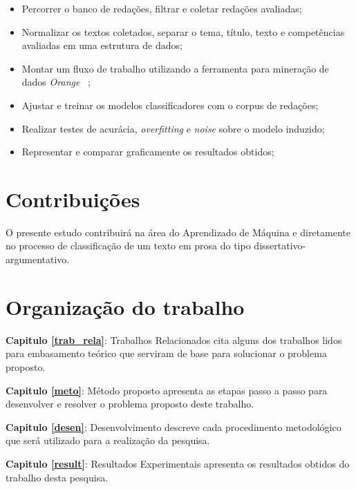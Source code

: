 \begin{itemize}
 \item Percorrer o banco de redações, filtrar e coletar redações avaliadas;
 \item Normalizar os textos coletados, separar o tema, título, texto e competências avaliadas em uma estrutura de dados;
 \item Montar um fluxo de trabalho utilizando a ferramenta para mineração de dados \textit{Orange} ~\cite{JMLR:demsar13a};
 \item Ajustar e treinar os modelos classificadores com o corpus de redações; 
 \item Realizar testes de acurácia, \textit{overfitting} e \textit{noise} sobre o modelo induzido;
 \item Representar e comparar graficamente os resultados obtidos;
\end{itemize}

\section{Contribuições}

O presente estudo contribuirá na área do Aprendizado de Máquina e diretamente no processo de classificação de um texto em prosa do tipo dissertativo-argumentativo.

\section{Organização do trabalho}

\noindent \textbf{Capitulo \ref{trab_rela}}: Trabalhos Relacionados cita alguns dos trabalhos lidos para  embasamento teórico que serviram de base para solucionar o problema proposto.

\noindent \textbf{Capitulo \ref{meto}}: Método proposto apresenta as etapas passo a passo para desenvolver e resolver o problema proposto deste trabalho.

\noindent \textbf{Capitulo \ref{desen}}: Desenvolvimento descreve cada procedimento metodológico que será
utilizado para a realização da pesquisa.

\noindent \textbf{Capitulo \ref{result}}: Resultados Experimentais apresenta os resultados obtidos do trabalho desta pesquisa.